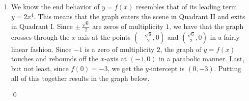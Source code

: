 \documentclass{ximera}
\begin{document}
\begin{example}
\begin{enumerate}
\begin{center}
\begin{tabular}{cl}
\quad&\quad

$
\begin{array}{r}
 -1 \quad |\quad 2 \quad\quad 4 \quad\quad -1 \quad\quad -6 \quad\quad -3\\
 \underline{\downarrow \phantom{.}\quad  -2 \quad\quad -2\quad\quad\quad 3 \quad\quad\quad 3}\\
 -1 \quad |\quad 2 \quad\quad 2 \quad\phantom{11} -3 \quad\quad -3 \quad\quad \fbox{0}\\
 \underline{\downarrow \phantom{1.} -2 \quad\phantom{1111} 0\quad\phantom{1111} 3 \phantom{\quad\quad \fbox{0}}}\\
2 \phantom{1.}\quad\quad 0 \phantom{1.}\quad -3 \phantom{1.}\quad \fbox{0} \phantom{\quad\quad \fbox{0}}
\end{array}
$  


\end{tabular}
\end{center}
Setting the quotient polynomial equal to zero yields $2x^2 - 3 = 0$, so that $x^2 = \frac{3}{2}$, or $x = \pm \, \frac{\sqrt{6}}{2}$.  Descartes' Rule of Signs tells us that the positive real zero we found, $\frac{\sqrt{6}}{2}$, has multiplicity $1$.  Descartes also tells us the total multiplicity of negative real zeros is $3$, which forces $-1$ to be a zero of multiplicity $2$ and $- \frac{\sqrt{6}}{2}$ to have multiplicity $1$.  

\item  We know the end behavior of $y=f(x)$ resembles that of its leading term $y=2x^4$.  This means that the graph enters the scene in Quadrant II and exits in Quadrant I.  Since $\pm \, \frac{\sqrt{6}}{2}$ are zeros of multiplicity $1$, we have that the graph crosses through the $x$-axis at the points $\left( -\frac{\sqrt{6}}{2}, 0 \right)$ and $\left( \frac{\sqrt{6}}{2}, 0 \right)$ in a fairly linear fashion.  Since $-1$ is a zero of multiplicity $2$, the graph of $y=f(x)$ touches and rebounds off the $x$-axis at $(-1,0)$ in a parabolic manner.  Last, but not least, since $f(0) = -3$, we get the  $y$-intercept is $(0,-3)$.  Putting all of this together results in the graph below.

\begin{center}
\end{center}

\qed

\end{enumerate}

\end{example}
\end{document}
